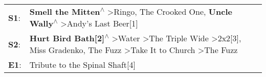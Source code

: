 \begin{supertabular}{p{0.03\textwidth}p{0.92\textwidth}}
 \textbf{S1}:  &                                                                                                                                   \textbf{Smell the Mitten\textsuperscript{$\wedge$}} \textgreater \enspace Ringo\textsuperscript{}, \enspace The Crooked One\textsuperscript{}, \enspace \textbf{Uncle Wally\textsuperscript{$\wedge$}} \textgreater \enspace Andy's Last Beer[1]\textsuperscript{}  \enspace  \\
 \textbf{S2}:  &  \textbf{Hurt Bird Bath[2]\textsuperscript{$\wedge$}} \textgreater \enspace Water\textsuperscript{} \textgreater \enspace The Triple Wide\textsuperscript{} \textgreater \enspace 2x2[3]\textsuperscript{}, \enspace Miss Gradenko\textsuperscript{}, \enspace The Fuzz\textsuperscript{} \textgreater \enspace Take It to Church\textsuperscript{} \textgreater \enspace The Fuzz\textsuperscript{}  \enspace  \\
 \textbf{E1}:  &                                                                                                                                                                                                                                                                                                                                                     Tribute to the Spinal Shaft[4]\textsuperscript{}  \enspace  \\
\end{supertabular}

